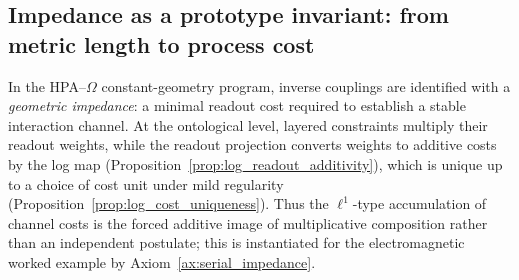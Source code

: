 \subsection{Impedance as a prototype invariant: from metric length to process cost}
In the HPA--$\Omega$ constant-geometry program, inverse couplings are identified with a \emph{geometric impedance}: a minimal readout cost required to establish a stable interaction channel. At the ontological level, layered constraints multiply their readout weights, while the readout projection converts weights to additive costs by the log map (Proposition~\ref{prop:log_readout_additivity}), which is unique up to a choice of cost unit under mild regularity (Proposition~\ref{prop:log_cost_uniqueness}). Thus the $\ell^1$-type accumulation of channel costs is the forced additive image of multiplicative composition rather than an independent postulate; this is instantiated for the electromagnetic worked example by Axiom~\ref{ax:serial_impedance}.
